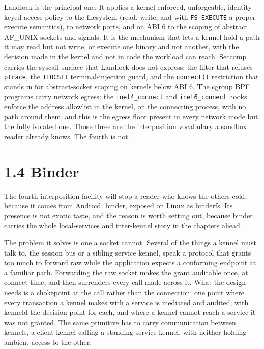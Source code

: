 Landlock is the principal one. It applies a kernel-enforced,
unforgeable, identity-keyed access policy to the filesystem (read,
write, and with \texttt{FS\_EXECUTE} a proper execute semantics), to
network ports, and on ABI 6 to the scoping of abstract AF\_UNIX sockets
and signals. It is the mechanism that lets a kennel hold a path it may
read but not write, or execute one binary and not another, with the
decision made in the kernel and not in code the workload can reach.
Seccomp carries the syscall surface that Landlock does not express: the
filter that refuses \texttt{ptrace}, the \texttt{TIOCSTI}
terminal-injection guard, and the \texttt{connect()} restriction that
stands in for abstract-socket scoping on kernels below ABI 6. The cgroup
BPF programs carry network egress: the \texttt{inet4\_connect} and
\texttt{inet6\_connect} hooks enforce the address allowlist in the
kernel, on the connecting process, with no path around them, and this is
the egress floor present in every network mode but the fully isolated
one. Those three are the interposition vocabulary a sandbox reader
already knows. The fourth is not.

\hypertarget{binder}{%
\section{1.4 Binder}\label{binder}}

The fourth interposition facility will stop a reader who knows the
others cold, because it comes from Android: binder, exposed on Linux as
binderfs. Its presence is not exotic taste, and the reason is worth
setting out, because binder carries the whole local-services and
inter-kennel story in the chapters ahead.

The problem it solves is one a socket cannot. Several of the things a
kennel must talk to, the session bus or a sibling service kennel, speak
a protocol that grants too much to forward raw while the application
expects a conforming endpoint at a familiar path. Forwarding the raw
socket makes the grant auditable once, at connect time, and then
surrenders every call made across it. What the design needs is a
chokepoint at the call rather than the connection: one point where every
transaction a kennel makes with a service is mediated and audited, with
kenneld the decision point for each, and where a kennel cannot reach a
service it was not granted. The same primitive has to carry
communication between kennels, a client kennel calling a standing
service kennel, with neither holding ambient access to the other.

